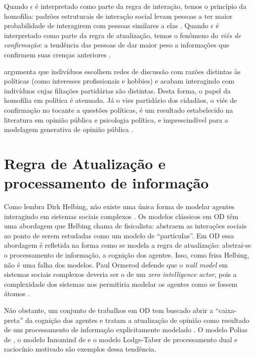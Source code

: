 Quando \(\epsilon\) é interpretado como parte da regra de interação, temos o princípio
da homofilia: padrões estruturais de interação social levam pessoas a ter maior
probabilidade de interagirem com pessoas similares a elas
\cite{mcpherson2001birds}. Quando \(\epsilon\) é interpretado como parte da regra de
atualização, temos o fenômeno do \textit{viés de confirmação}: a tendência das
pessoas de dar maior peso a informações que confirmem suas crenças anteriores
\cite{nickerson1998confirmation}.

 argumenta que indivíduos escolhem redes de
discussão com razões distintas às políticas (como interesses profissionais e
hobbies) e acabam interagindo com indivíduos cujas filiações partidárias são
distintas. Desta forma, o papel da homofilia em política é atenuado. Já o
vies partidário dos cidadãos, o viés de confirmação no tocante a
questões políticas, é um resultado estabelecido na literatura em opinião pública
e psicologia política, e imprescindível para a modelagem generativa de opinião
pública \cite{bartels2002beyond, flynn2017nature, lodge2013rationalizing}.


\section{Regra de Atualização e processamento de informação}


Como lembra Dirk Helbing, não existe uma única forma de modelar agentes
interagindo em sistemas sociais complexos \cite{helbing2010pluralistic}. Os
modelos clássicos em OD têm uma abordagem que Helbing chama de fisicalista:
abstraem as interações sociais ao ponto de serem estudadas como um modelo de
``partículas''. Em OD essa abordagem é refletida na forma como se modela a regra
de atualização: abstrai-se o processamento de informação, a cognição dos
agentes. Isso, como frisa Helbing, não é uma falha dos modelos. Paul Ormerod
defende que o \textit{null model} em sistemas sociais complexos deveria ser o de
um \textit{zero intelligence actor}, pois a complexidade dos sistemas nos
permitiria modelar os agentes como se fossem átomos \cite{ormerod2008can,
  bentley2012agents}.

Não obstante, um conjunto de trabalhos em OD tem buscado abrir a ``caixa-preta''
da cognição dos agentes e tratam a atualização de opinião como resultado de um
processamento de informação explicitamente modelado \cite{flache2017,
  jager2017}. O modelo Polias de , o modelo
Innomind de  e o modelo Lodge-Taber
\cite{kim2010computational,kim2011model} de processamento dual e raciocínio
motivado são exemplos dessa tendência.

